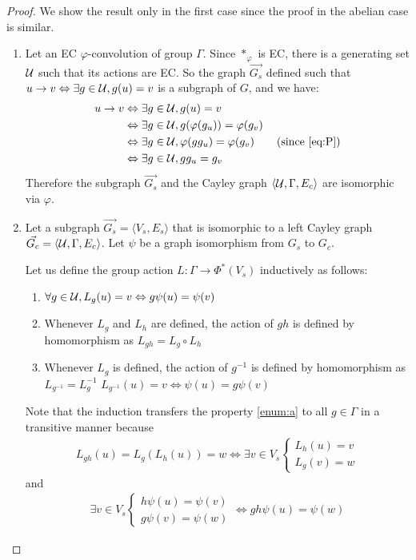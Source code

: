 \begin{proof}
We show the result only in the first case since the proof in the abelian case is similar.
\begin{enumerate}
	\item Let an EC $\varphi$-convolution of group $\Gamma$. Since $\ast_\varphi$ is EC, there is a generating set $\mathcal{U}$ such that its actions are EC.
  So the graph $\vec{G_s}$ defined such that $u \to v \Leftrightarrow \exists g \in \mathcal{U}, g(u) = v$ is a subgraph of $G$, and we have:
  \begin{align*}
  u \to v & \Leftrightarrow \exists g \in \cu, g(u) = v\\
          & \Leftrightarrow \exists g \in \cu, g(\varphi(g_u)) = \varphi(g_v)\\
          & \Leftrightarrow \exists g \in \cu, \varphi(gg_u) = \varphi(g_v) \tag{since \eqref{eq:P}}\\
          & \Leftrightarrow \exists g \in \cu, gg_u = g_v
  \end{align*}
  Therefore the subgraph $\vec{G_s}$ and the Cayley graph $\langle \mathcal{U}, \Gamma, E_c \rangle$ are isomorphic via $\varphi$.

	\item Let a subgraph $\vec{G_s} = \langle V_s, E_s \rangle$ that is isomorphic to a left Cayley graph $\vec{G_c} = \langle \mathcal{U}, \Gamma, E_c \rangle$. Let $\psi$ be a graph isomorphism from $G_s$ to $G_c$.%

Let us define the group action $L : \Gamma \to \Phi^*(V_s)$ inductively as follows:
\begin{enumerate}[label=(\alph*)]
  \item $\forall g \in \mathcal{U}, L_g(u) = v \Leftrightarrow g\psi(u) = \psi(v)$ \label{enum:a}
  \item Whenever $L_g$ and $L_h$ are defined, the action of $gh$ is defined by homomorphism as $L_{gh}= L_g \circ L_h$ \label{enum:b}
  \item Whenever $L_g$ is defined, the action of $g^{-1}$ is defined by homomorphism as $L_{g^{-1}}=L_g^{-1}$ \ie $L_{g^{-1}}(u) = v \Leftrightarrow \psi(u) = g\psi(v)$ \label{enum:c}
\end{enumerate}

Note that the induction transfers the property \ref{enum:a} to all $g \in \Gamma$ in a transitive manner because
\begin{gather*}
L_{gh}(u) = L_g(L_h(u)) = w \Leftrightarrow \exists v \in V_s
\begin{cases}
L_h(u) = v\\
L_g(v) = w
\end{cases}
\end{gather*}
and
\begin{gather*}
\exists v \in V_s
\begin{cases}
h\psi(u) = \psi(v)\\
g\psi(v) = \psi(w)
\end{cases}
\Leftrightarrow gh\psi(u) = \psi(w)
\end{gather*}


\end{enumerate}
\end{proof}

